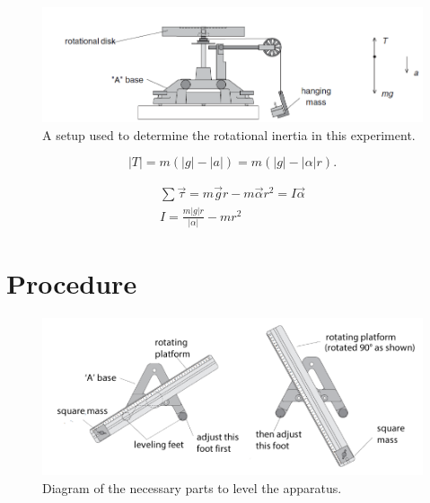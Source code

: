 \begin{figure}[h]
	\begin{center}
	\includegraphics[width=01.0\textwidth]{./Exp1-7/pic/diskwithmass.png}
	\end{center}
	\caption{A setup used to determine the rotational inertia in this experiment.}
	\label{fig:initsetup}
\end{figure}


\begin{equation}
|T| = m(|g|- |a|) = m(|g|-|\alpha| r).
\end{equation}


\begin{gather}
\sum \vec \tau = m\vec gr - m \vec \alpha r^{2} = I \vec \alpha \\
I = \frac{m|g|r}{|\alpha|} - mr^2
\end{gather}

\myskip

\section{Procedure}
\label{angexp}

\begin{figure}[!h]
	\begin{center}
	\includegraphics[width=1.0\textwidth]{./Exp1-7/pic/appbalance2.png}
	\end{center}
\caption{Diagram of the necessary parts to level the apparatus.}
\label{fig:levelapp}
\end{figure}

